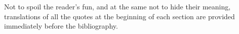 {\par
Not to spoil the reader's fun, and at the same not to hide their meaning, translations of all the quotes at the beginning of each section are provided immediately before the bibliography.
}
